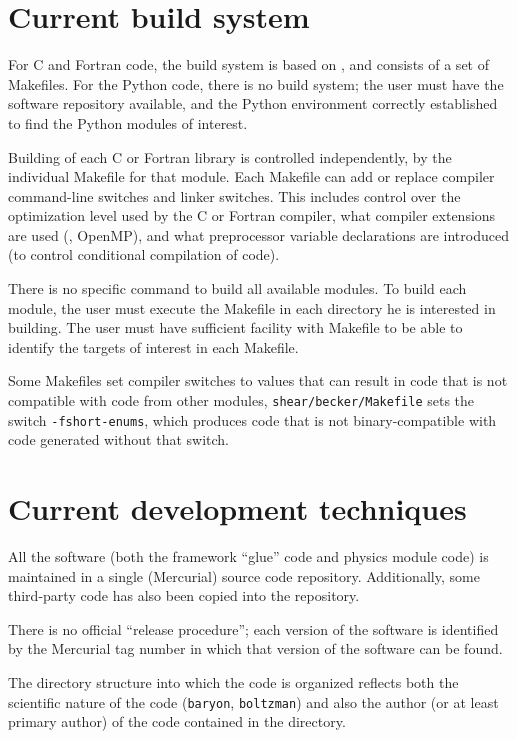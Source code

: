 \documentclass[draftmode,draftwater]{memarticle}
\newcommand{\prog}[1]%
  {\texttt{#1}}
\newcommand{\despipe}{\name{des-pipe}\xspace}
\begin{document}
\section{Current build system}

For C and Fortran code, the \despipe build system is based on
, and consists of a set of Makefiles. For the Python code,
there is no build system; the user must have the software repository
available, and the Python environment correctly established to find the
Python modules of interest.

Building of each C or Fortran library is controlled independently, by
the individual Makefile for that module. Each Makefile can add or
replace compiler command-line switches and linker switches. This
includes control over the optimization level used by the C or Fortran
compiler, what compiler extensions are used (\eg, OpenMP), and what
preprocessor variable declarations are introduced (to control
conditional compilation of code).

There is no specific command to build all available modules. To build
each module, the user must execute the Makefile in each directory he is
interested in building. The user must have sufficient facility with
Makefile to be able to identify the targets of interest in each
Makefile.

Some Makefiles set compiler switches to values that can result in code
that is not compatible with code from other modules, \eg
\prog{shear/becker/Makefile} sets the switch \texttt{-fshort-enums},
which produces code that is not binary-compatible with code generated
without that switch.

\section{Current development techniques}

All the \despipe software (both the framework ``glue'' code and
physics module code) is maintained in a single (Mercurial) source code
repository. Additionally, some third-party code has also been copied
into the \despipe repository.

There is no official ``release procedure''; each version of the software
is identified by the Mercurial tag number in which that version of the
software can be found.

The directory structure into which the code is organized reflects both
the scientific nature of the code (\eg \prog{baryon}, \prog{boltzman})
and also the author (or at least primary author) of the code contained
in the directory.
\end{document}

